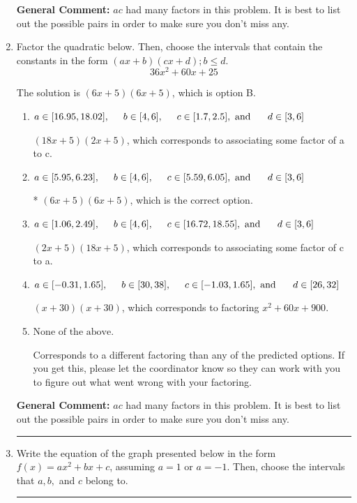 \documentclass{extbook}[14pt]
\newcommand{\litem}[1]{\item #1

\rule{\textwidth}{0.4pt}}
\begin{document}
\begin{enumerate}
{\textbf{General Comment:} $ac$ had many factors in this problem. It is best to list out the possible pairs in order to make sure you don't miss any.
}
\litem{
Factor the quadratic below. Then, choose the intervals that contain the constants in the form $(ax+b)(cx+d); b \leq d.$
\[ 36x^{2} +60 x + 25 \]

The solution is \( (6x + 5)(6x + 5) \), which is option B.\begin{enumerate}[label=\Alph*.]
\item \( a \in [16.95, 18.02], \hspace*{5mm} b \in [4, 6], \hspace*{5mm} c \in [1.7, 2.5], \text{ and } \hspace*{5mm} d \in [3, 6] \)

 $(18x + 5)(2x + 5)$, which corresponds to associating some factor of a to c.
\item \( a \in [5.95, 6.23], \hspace*{5mm} b \in [4, 6], \hspace*{5mm} c \in [5.59, 6.05], \text{ and } \hspace*{5mm} d \in [3, 6] \)

* $(6x + 5)(6x + 5)$, which is the correct option.
\item \( a \in [1.06, 2.49], \hspace*{5mm} b \in [4, 6], \hspace*{5mm} c \in [16.72, 18.55], \text{ and } \hspace*{5mm} d \in [3, 6] \)

 $(2x + 5)(18x + 5)$, which corresponds to associating some factor of c to a.
\item \( a \in [-0.31, 1.65], \hspace*{5mm} b \in [30, 38], \hspace*{5mm} c \in [-1.03, 1.65], \text{ and } \hspace*{5mm} d \in [26, 32] \)

 $(x + 30)(x + 30)$, which corresponds to factoring $x^{2} +60 x + 900$.
\item \( \text{None of the above.} \)

 Corresponds to a different factoring than any of the predicted options. If you get this, please let the coordinator know so they can work with you to figure out what went wrong with your factoring.
\end{enumerate}

\textbf{General Comment:} $ac$ had many factors in this problem. It is best to list out the possible pairs in order to make sure you don't miss any.
}
\litem{
Write the equation of the graph presented below in the form $f(x)=ax^2+bx+c$, assuming  $a=1$ or $a=-1$. Then, choose the intervals that $a, b,$ and $c$ belong to.

}
\end{enumerate}
\end{document}
